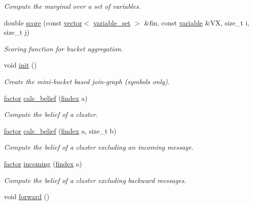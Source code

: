 \begin{DoxyCompactItemize}
\begin{DoxyCompactList}\small\item\em Compute the marginal over a set of variables. \end{DoxyCompactList}\item 
double \hyperlink{classmerlin_1_1ijgp_a3805cbe0335c203902d3741293c30030}{score} (const \hyperlink{classmerlin_1_1vector}{vector}$<$ \hyperlink{classmerlin_1_1variable__set}{variable\+\_\+set} $>$ \&fin, const \hyperlink{classmerlin_1_1variable}{variable} \&VX, size\+\_\+t i, size\+\_\+t j)
\begin{DoxyCompactList}\small\item\em Scoring function for bucket aggregation. \end{DoxyCompactList}\item 
void \hyperlink{classmerlin_1_1ijgp_a8300ed201011020d5dffe498d3de44c1}{init} ()\hypertarget{classmerlin_1_1ijgp_a8300ed201011020d5dffe498d3de44c1}{}\label{classmerlin_1_1ijgp_a8300ed201011020d5dffe498d3de44c1}

\begin{DoxyCompactList}\small\item\em Create the mini-\/bucket based join-\/graph (symbols only). \end{DoxyCompactList}\item 
\hyperlink{classmerlin_1_1factor}{factor} \hyperlink{classmerlin_1_1ijgp_a1d7412044771f675633ec1ff12c26eaf}{calc\+\_\+belief} (\hyperlink{classmerlin_1_1ijgp_af19ce723db28f47c2b35903adbf3d4bc}{findex} a)
\begin{DoxyCompactList}\small\item\em Compute the belief of a cluster. \end{DoxyCompactList}\item 
\hyperlink{classmerlin_1_1factor}{factor} \hyperlink{classmerlin_1_1ijgp_a19bb2cc8542ce62c994b914b456ae0e3}{calc\+\_\+belief} (\hyperlink{classmerlin_1_1ijgp_af19ce723db28f47c2b35903adbf3d4bc}{findex} a, size\+\_\+t b)
\begin{DoxyCompactList}\small\item\em Compute the belief of a cluster excluding an incoming message. \end{DoxyCompactList}\item 
\hyperlink{classmerlin_1_1factor}{factor} \hyperlink{classmerlin_1_1ijgp_aea8e02bac8d7c6f5577bb4269b253726}{incoming} (\hyperlink{classmerlin_1_1ijgp_af19ce723db28f47c2b35903adbf3d4bc}{findex} a)
\begin{DoxyCompactList}\small\item\em Compute the belief of a cluster excluding backward messages. \end{DoxyCompactList}\item 
void \hyperlink{classmerlin_1_1ijgp_a61caa150c8d8bdfb7e26640a5d62ebd6}{forward} ()\hypertarget{classmerlin_1_1ijgp_a61caa150c8d8bdfb7e26640a5d62ebd6}{}\label{classmerlin_1_1ijgp_a61caa150c8d8bdfb7e26640a5d62ebd6}


\end{DoxyCompactItemize}
